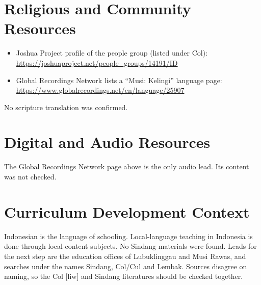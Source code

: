 \documentclass[12pt]{article}
\begin{document}
\section{Religious and Community Resources}
\begin{itemize}
\item Joshua Project profile of the people group (listed under Col): \url{https://joshuaproject.net/people_groups/14191/ID}
\item Global Recordings Network lists a ``Musi: Kelingi'' language page: \url{https://www.globalrecordings.net/en/language/25907}
\end{itemize}
No scripture translation was confirmed.

\section{Digital and Audio Resources}
The Global Recordings Network page above is the only audio lead. Its content was not checked.

\section{Curriculum Development Context}
Indonesian is the language of schooling. Local-language teaching in Indonesia is done through local-content subjects. No Sindang materials were found. Leads for the next step are the education offices of Lubuklinggau and Musi Rawas, and searches under the names Sindang, Col/Cul and Lembak. Sources disagree on naming, so the Col [liw] and Sindang literatures should be checked together.
\end{document}
